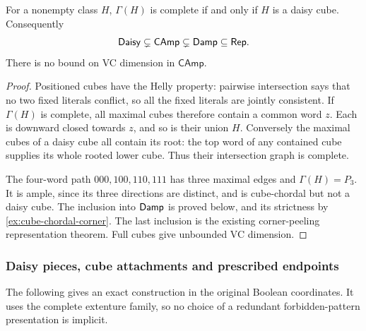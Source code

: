 \begin{proposition}
\label{prop:cube-chordal-daisy}
For a nonempty class $H$, $\Gamma(H)$ is complete if and only if $H$ is
a daisy cube. Consequently
\[
 \mathsf{Daisy}\subsetneq\mathsf{CAmp}\subsetneq\mathsf{Damp}\subseteq\mathsf{Rep}.
\]
There is no bound on VC dimension in $\mathsf{CAmp}$.
\end{proposition}
\begin{proof}
Positioned cubes have the Helly property: pairwise intersection says that
no two fixed literals conflict, so all the fixed literals are jointly
consistent. If $\Gamma(H)$ is complete, all maximal cubes therefore
contain a common word $z$. Each is downward closed towards $z$, and so
is their union $H$. Conversely the maximal cubes of a daisy cube all
contain its root: the top word of any contained cube supplies its whole
rooted lower cube. Thus their intersection graph is complete.

The four-word path $000,100,110,111$ has three maximal edges and
$\Gamma(H)=P_3$. It is ample, since its three directions are distinct,
and is cube-chordal but not a daisy cube. The inclusion into $\mathsf{Damp}$
is proved below, and its strictness by
\cref{ex:cube-chordal-corner}. The last inclusion is the existing
corner-peeling representation theorem. Full cubes give unbounded VC dimension.
\end{proof}

\subsubsection{Daisy pieces, cube attachments and prescribed endpoints}

The following gives an exact construction in the original Boolean
coordinates. It uses the complete extenture family, so no choice of a
redundant forbidden-pattern presentation is implicit.

